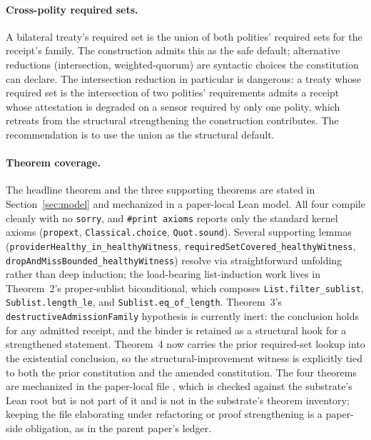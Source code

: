 \paragraph{Cross-polity required sets.}
A bilateral treaty's required set is the union of both polities' required sets for the receipt's family. The construction admits this as the safe default; alternative reductions (intersection, weighted-quorum) are syntactic choices the constitution can declare. The intersection reduction in particular is dangerous: a treaty whose required set is the intersection of two polities' requirements admits a receipt whose attestation is degraded on a sensor required by only one polity, which retreats from the structural strengthening the construction contributes. The recommendation is to use the union as the structural default.

\paragraph{Theorem coverage.}
The headline theorem and the three supporting theorems are stated in Section~\ref{sec:model} and mechanized in a paper-local Lean model. All four compile cleanly with no \texttt{sorry}, and \texttt{\#print axioms} reports only the standard kernel axioms (\texttt{propext}, \texttt{Classical.choice}, \texttt{Quot.sound}). Several supporting lemmas (\texttt{providerHealthy\_in\_healthyWitness}, \texttt{requiredSetCovered\_healthyWitness}, \texttt{dropAndMissBounded\_healthyWitness}) resolve via straightforward unfolding rather than deep induction; the load-bearing list-induction work lives in Theorem~2's proper-sublist biconditional, which composes \texttt{List.filter\_sublist}, \texttt{Sublist.length\_le}, and \texttt{Sublist.eq\_of\_length}. Theorem~3's \texttt{destructiveAdmissionFamily} hypothesis is currently inert: the conclusion holds for any admitted receipt, and the binder is retained as a structural hook for a strengthened statement. Theorem~4 now carries the prior required-set lookup into the existential conclusion, so the structural-improvement witness is explicitly tied to both the prior constitution and the amended constitution. The four theorems are mechanized in the paper-local file , which is checked against the substrate's Lean root but is not part of it and is not in the substrate's theorem inventory; keeping the file elaborating under refactoring or proof strengthening is a paper-side obligation, as in the parent paper's ledger.

